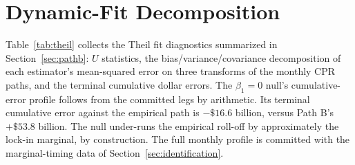 \documentclass[12pt]{article}
\begin{document}
\section{Dynamic-Fit Decomposition}\label{app:theil}

Table~\ref{tab:theil} collects the Theil fit diagnostics summarized in Section~\ref{sec:pathb}: $U$ statistics, the bias/variance/covariance decomposition of each estimator's mean-squared error on three transforms of the monthly CPR paths, and the terminal cumulative dollar errors. The $\beta_1 = 0$ null's cumulative-error profile follows from the committed legs by arithmetic. Its terminal cumulative error against the empirical path is $-\$16.6$ billion, versus Path B's $+\$53.8$ billion. The null under-runs the empirical roll-off by approximately the lock-in marginal, by construction. The full monthly profile is committed with the marginal-timing data of Section~\ref{sec:identification}.
\end{document}
